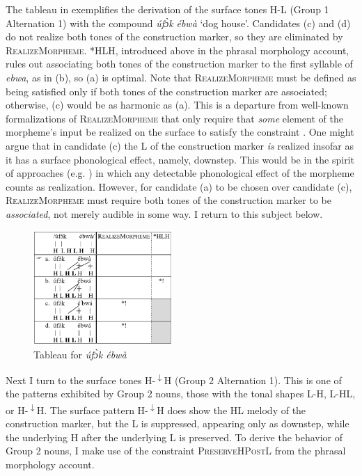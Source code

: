 \documentclass[output=paper]{langscibook}
\begin{document}
The tableau in  exemplifies the derivation of the surface tones H-L (Group 1 Alternation 1) with the compound \textit{úfɔ̀k} \textit{ébwà} ‘dog house’. Candidates (c) and (d) do not realize both tones of the construction marker, so they are eliminated by \textsc{RealizeMorpheme}. *HLH, introduced above in the phrasal morphology account, rules out associating both tones of the construction marker to the first syllable of \textit{ebwa}, as in (b), so (a) is optimal. Note that \textsc{RealizeMorpheme} must be defined as being satisfied only if both tones of the construction marker are associated; otherwise, (c) would be as harmonic as (a). This is a departure from well-known formalizations of \textsc{RealizeMorpheme} that only require that \textit{some} element of the morpheme’s input be realized on the surface to satisfy the constraint \citep{Gnanadesikan1997,Oostendorp2005}. One might argue that in candidate (c) the L of the construction marker \textit{is} realized insofar as it has a surface phonological effect, namely, downstep. This would be in the spirit of approaches (e.g. \citealt{Gnanadesikan1997}) in which any detectable phonological effect of the morpheme counts as realization. However, for candidate (a) to be chosen over candidate (c), \textsc{RealizeMorpheme} must require both tones of the construction marker to be \textit{associated}, not merely audible in some way. I return to this subject below.\largerpage

\begin{figure}
\includegraphics[width=53mm]{figures/glewwe-img6.png}
\caption{Tableau for \textit{úfɔ̀k ébwà}}
\label{fig:glewwe:7}
\end{figure}

Next I turn to the surface tones H-\textsuperscript{$\downarrow$}H (Group 2 Alternation 1). This is one of the patterns exhibited by Group 2 nouns, those with the tonal shapes L-H, L-HL, or H-\textsuperscript{$\downarrow$}H. The surface pattern H-\textsuperscript{$\downarrow$}H does show the HL melody of the construction marker, but the L is suppressed, appearing only as downstep, while the underlying H after the underlying L is preserved. To derive the behavior of Group 2 nouns, I make use of the constraint \textsc{PreserveHPostL} from the phrasal morphology account. 
\end{document}
